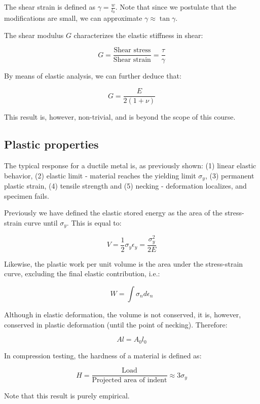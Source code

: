 \documentclass{article}
\begin{document}
\begin{definition}
    The shear strain is defined as $\gamma = \frac{w}{l_0}$. Note that since we postulate that the modifications are small, we can approximate $\gamma \approx \tan{\gamma}$.
\end{definition}

\begin{definition}
    The shear modulus $G$ characterizes the elastic stiffness in shear:

    \[ G = \frac{\text{Shear stress}}{\text{Shear strain}} = \frac{\tau}{\gamma} \]

    By means of elastic analysis, we can further deduce that:

    \[ G = \frac{E}{2(1 + \nu)} \]

    This result is, however, non-trivial, and is beyond the scope of this course.
\end{definition}

\subsection{Plastic properties}

The typical response for a ductile metal is, as previously shown: (1) linear elastic behavior, (2) elastic limit - material reaches the yielding limit $\sigma_y$, (3) permanent plastic strain, (4) tensile strength and (5) necking - deformation localizes, and specimen fails.

Previously we have defined the elastic stored energy as the area of the stress-strain curve until $\sigma_y$. This is equal to:

\[ V = \frac{1}{2}\sigma_y\epsilon_y = \frac{\sigma_y^2}{2E} \]

Likewise, the plastic work per unit volume is the area under the stress-strain curve, excluding the final elastic contribution, i.e.:

\[ W = \int \sigma_n d\epsilon_n \]

Although in elastic deformation, the volume is not conserved, it is, however, conserved in plastic deformation (until the point of necking). Therefore:

\[ Al = A_0l_0 \]

\begin{definition}[Hardness]
    In compression testing, the hardness of a material is defined as:

    \[ H = \frac{\text{Load}}{\text{Projected area of indent}} \approx 3\sigma_y \]

    Note that this result is purely empirical.
\end{definition}
\end{document}
